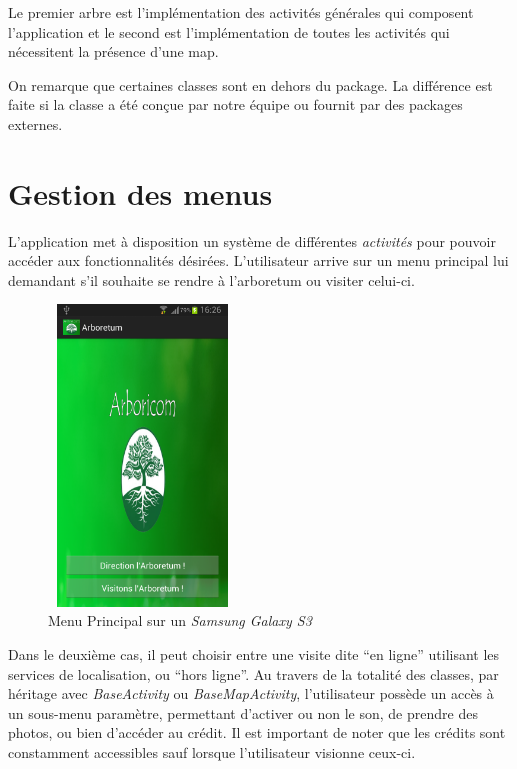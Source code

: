 \documentclass[a4paper,11pt]{article}
\begin{document}
    Le premier arbre est l'implémentation des activités générales qui composent l'application et le second est l'implémentation de toutes les activités 
    qui nécessitent la présence d'une map.
    
    On remarque que certaines classes sont en dehors du package. La différence est faite si la classe a été conçue par notre équipe ou fournit par des packages externes.
      \newpage
		\section{Gestion des menus}
		
		L'application met à disposition un système de différentes \emph{activités} pour pouvoir accéder aux fonctionnalités désirées. 
		L'utilisateur arrive sur un menu principal lui demandant s'il souhaite se rendre à l'arboretum ou visiter celui-ci. 
    \begin{figure}[H]
     \begin{center}
      \includegraphics[width=5cm,height=8cm]{menu.png}
      \caption{Menu Principal sur un \textit{Samsung Galaxy S3}}
     \end{center}
    \end{figure}
		Dans le deuxième cas, il peut choisir entre une visite dite ``en ligne'' utilisant les services de localisation, ou ``hors ligne''. 
		Au travers de la totalité des classes, par héritage avec \emph{BaseActivity} ou \emph{BaseMapActivity}, l'utilisateur possède un accès 
		à un sous-menu paramètre, permettant d'activer ou non le son, de prendre des photos, ou bien d’accéder au crédit. 
		Il est important de noter que les crédits sont constamment accessibles sauf lorsque l'utilisateur visionne ceux-ci. 
\end{document}
